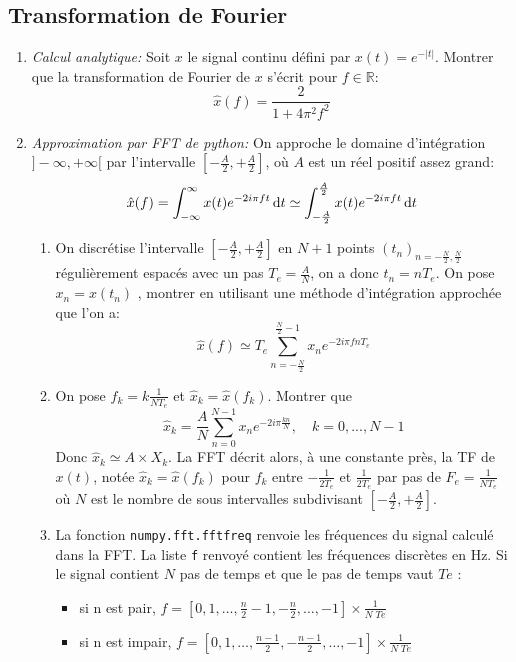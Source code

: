 \documentclass{article}
\def \de {{\rm d}}
\begin{document}
\subsection*{Transformation de Fourier}
\begin{enumerate}
\item {\em Calcul analytique:} Soit $x$ le signal continu défini par $x(t)=e^{-|t|}$. Montrer que la transformation de Fourier de $x$ s'écrit pour $f\in\mathbb{R}$:
\[ \hat x(f)=\frac{2}{1+4\pi^2f^2}\]
\item {\em Approximation par FFT de  python:}  On approche le domaine d'intégration $]-\infty,+\infty[$ par l'intervalle $[-\frac A2,+\frac A2]$, où $A$ est un réel positif  assez grand:
\[\hat x(f)=\int_{-\infty}^{\infty}x(t)e^{-2i\pi f t}\, \de t\simeq \int_{-\frac A2}^{\frac A2}x(t)e^{-2i\pi f t}\, \de t\]
\begin{enumerate}
\item On discrétise l'intervalle $[-\frac A2,+\frac A2]$ en $N+1$ points $(t_n)_{n=-\frac{N}{2},\frac{N}{2}}$ régulièrement espacés avec un pas $T_e=\frac{A}{N}$, on a donc $t_n=nT_e$. On pose $x_n=x(t_n)$ , montrer en utilisant une méthode d'intégration approchée que l'on a:
\[\hat x(f)\simeq T_e\sum_{n=-\frac{N}{2}}^{\frac{N}{2}-1}x_n e^{-2i\pi f n T_e}\]
\item On pose $f_k=k\frac{1}{NT_e}$ et $\hat x_k=\hat x(f_k)$. Montrer que
\[\hat x_k=\frac AN\sum_{n=0}^{N-1}x_ne^{-2i\pi \frac{kn}{N}},\quad k=0,...,N-1\]
Donc $\hat x_k\simeq A\times X_k$. La FFT décrit alors, à une constante près, la
TF de $x(t)$, notée $\hat x_k=\hat x(f_k)$ pour $f_k$ entre $-\frac{1}{2 T_e}$ et $\frac{1}{2 T_e}$  par pas de $F_e=\frac{1}{N T_e}$ où $N$ est le nombre de sous intervalles subdivisant  $[-\frac A2,+\frac A2]$.

\item La fonction {\tt numpy.fft.fftfreq} renvoie les fréquences du signal calculé dans la FFT. La liste {\tt f} renvoyé contient les fréquences discrètes en Hz. Si le signal contient $N$ pas de temps et que le pas de temps vaut $Te$ :
\begin{itemize}
\item si n est pair, $f=[0, 1, …, \frac n2-1, -\frac n2, …, -1]\times\frac 1 {N\; Te}$ 
\item si n est impair, $f=[0, 1, …, \frac {n-1}2, -\frac {n-1}2, …, -1]\times\frac 1 {N\; Te}$ 
\end{itemize}


\end{enumerate}
\end{enumerate}
\end{document}
